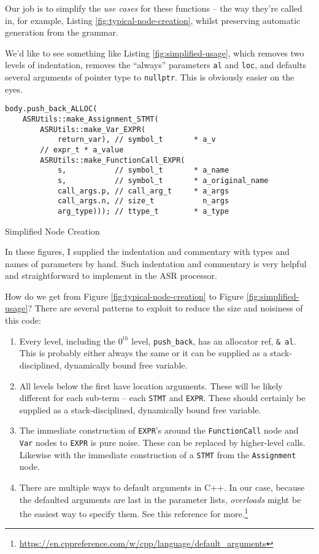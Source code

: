 \documentclass[10pt,oneside,x11names]{article}
\begin{document}
Our job is to simplify the \emph{use cases} for these functions -- the
way they're called in, for example, Listing
\ref{fig:typical-node-creation}, whilst preserving automatic
generation from the grammar.

We'd like to see something like Listing
\ref{fig:simplified-usage}, which removes two levels of
indentation, removes the ``always'' parameters \texttt{al} and \texttt{loc}, and
defaults several arguments of pointer type to \texttt{nullptr}. This is obviously easier on the eyes.

\begin{listing}[htbp]
\begin{verbatim}
body.push_back_ALLOC(
    ASRUtils::make_Assignment_STMT(
        ASRUtils::make_Var_EXPR(
            return_var), // symbol_t       * a_v
        // expr_t * a_value
        ASRUtils::make_FunctionCall_EXPR(
            s,           // symbol_t       * a_name
            s,           // symbol_t       * a_original_name
            call_args.p, // call_arg_t     * a_args
            call_args.n, // size_t           n_args
            arg_type))); // ttype_t        * a_type
\end{verbatim}
\caption{\label{fig:simplified-usage}Simplified Node Creation}
\end{listing}

In these figures, I supplied the indentation and commentary with
types and names of parameters by hand. Such indentation and
commentary is very helpful and straightforward to implement in the
ASR processor.

How do we get from Figure \ref{fig:typical-node-creation} to
Figure \ref{fig:simplified-usage}? There are several patterns to
exploit to reduce the size and noisiness of this code:

\begin{enumerate}
\item Every level, including the \(0^{th}\) level, \texttt{push\_back}, has an
allocator ref, \texttt{\& al}. This is probably either always the same
or it can be supplied as a stack-disciplined, dynamically
bound free variable.

\item All levels below the first have location arguments. These will
be likely different for each sub-term -- each \texttt{STMT} and
\texttt{EXPR}. These should certainly be supplied as a
stack-disciplined, dynamically bound free variable.

\item The immediate construction of \texttt{EXPR}'s around the
\texttt{FunctionCall} node and \texttt{Var} nodes to \texttt{EXPR} is pure noise.
These can be replaced by higher-level calls. Likewise with
the immediate construction of a \texttt{STMT} from the \texttt{Assignment}
node.

\item There are multiple ways to default arguments in C++. In our
case, because the defaulted arguments are last in the parameter
lists, \emph{overloads} might be the easiest way to specify them.
See this reference for more.\footnote{\url{https://en.cppreference.com/w/cpp/language/default\_arguments}}
\end{enumerate}
\end{document}
